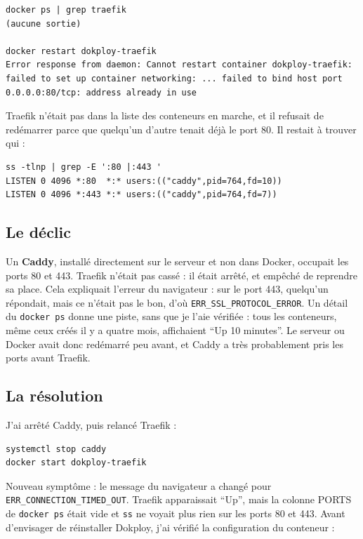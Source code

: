 \documentclass[10pt,twoside,openany]{article}
\begin{document}
\begin{lstlisting}
docker ps | grep traefik
(aucune sortie)

docker restart dokploy-traefik
Error response from daemon: Cannot restart container dokploy-traefik: failed to set up container networking: ... failed to bind host port 0.0.0.0:80/tcp: address already in use
\end{lstlisting}

Traefik n'était pas dans la liste des conteneurs en marche, et il refusait de redémarrer parce que quelqu'un d'autre tenait déjà le port 80. Il restait à trouver qui :

\begin{lstlisting}
ss -tlnp | grep -E ':80 |:443 '
LISTEN 0 4096 *:80  *:* users:(("caddy",pid=764,fd=10))
LISTEN 0 4096 *:443 *:* users:(("caddy",pid=764,fd=7))
\end{lstlisting}

\subsection*{Le déclic}
Un \textbf{Caddy}, installé directement sur le serveur et non dans Docker, occupait les ports 80 et 443. Traefik n'était pas cassé : il était arrêté, et empêché de reprendre sa place. Cela expliquait l'erreur du navigateur : sur le port 443, quelqu'un répondait, mais ce n'était pas le bon, d'où \texttt{ERR\_SSL\_PROTOCOL\_ERROR}. Un détail du \texttt{docker ps} donne une piste, sans que je l'aie vérifiée : tous les conteneurs, même ceux créés il y a quatre mois, affichaient \enquote{Up 10 minutes}. Le serveur ou Docker avait donc redémarré peu avant, et Caddy a très probablement pris les ports avant Traefik.

\subsection*{La résolution}
J'ai arrêté Caddy, puis relancé Traefik :

\begin{lstlisting}
systemctl stop caddy
docker start dokploy-traefik
\end{lstlisting}

Nouveau symptôme : le message du navigateur a changé pour \texttt{ERR\_CONNECTION\_TIMED\_OUT}. Traefik apparaissait \enquote{Up}, mais la colonne PORTS de \texttt{docker ps} était vide et \texttt{ss} ne voyait plus rien sur les ports 80 et 443. Avant d'envisager de réinstaller Dokploy, j'ai vérifié la configuration du conteneur :
\end{document}
